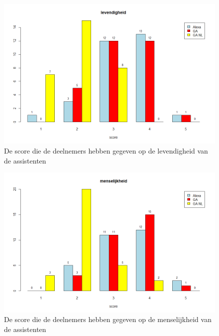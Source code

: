 \begin{figure}[h]
    \includegraphics[width=0.9\linewidth]{../onderzoek/onderzoeksresultaten/vergelijking_assistenten_per_eigenschap/barplot/barplot_score_levendigheid}
    \caption{De score die de deelnemers hebben gegeven op de levendigheid van de assistenten}
    \label{fig:barplot-levendigheid}
\end{figure}

\begin{figure}[h]
    \includegraphics[width=0.9\linewidth]{../onderzoek/onderzoeksresultaten/vergelijking_assistenten_per_eigenschap/barplot/barplot_score_menselijkheid}
    \caption{De score die de deelnemers hebben gegeven op de menselijkheid van de assistenten}
    \label{fig:barplot-menselijkheid}
\end{figure}

